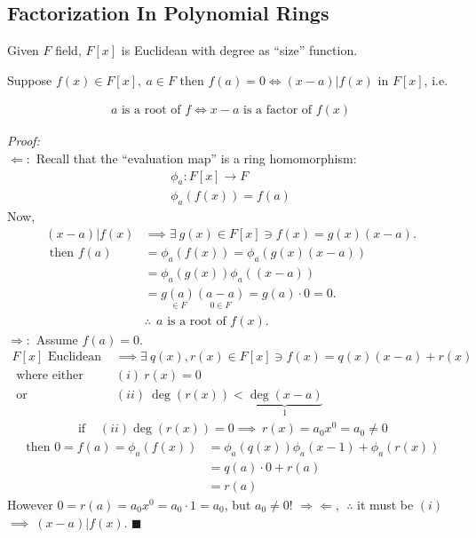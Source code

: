 \subsection*{Factorization In Polynomial Rings}
Given $F$ field, $F[x]$ is Euclidean with degree as ``size'' function.
\begin{lemma*}
    Suppose $f(x)\in F[x], \ a\in F$ then $f(a)=0 \iff (x-a)|f(x)$ in $F[x]$, i.e.
    \begin{center}
        \begin{align*}
            \boxed{ a \text{ is a root of }f \iff x-a \text{ is a factor of }f(x)}
        \end{align*}
    \end{center}
    \noindent \textit{Proof:} \\

    \noindent $\Leftarrow:$ Recall that the ``evaluation map'' is a ring homomorphism:
    \begin{align*}
        \phi_a: F[x]\rightarrow F \\
        \phi_a(f(x))=f(a)
    \end{align*}
    Now,
    \begin{align*}
        (x-a)|f(x) &\implies \exists \ g(x) \in F[x]\ni f(x)=g(x)(x-a). \\
        \text{ then }f(a) &= \phi_a(f(x))=\phi_a(g(x)(x-a)) \\
        &= \phi_a(g(x))\phi_a((x-a)) \\
        &= \underset{\in F}{g(a)}\underset{0\in F}{(a-a)} = g(a)\cdot 0 = 0. \\
        &\therefore \ \ a \text{ is a root of }f(x).
    \end{align*}
    \noindent $\Rightarrow :$ Assume $f(a)=0$. \\
    \begin{align*}
        F[x] \text{ Euclidean } &\implies \exists \ q(x), r(x) \in F[x] \ni f(x)=q(x)(x-a)+r(x) \\
        \text{ where either } &(i) \ r(x)=0  \\
        \text{ or } &(ii) \ \deg(r(x))< \underbrace{\deg(x-a)}_{1}
    \end{align*}
    \begin{align*}
        \text{ if }&(ii) \deg(r(x))=0 \implies \ r(x)=a_0x^0 = a_0 \neq 0
    \end{align*}
    \begin{align*}
        \text{ then } 0 = f(a) = \phi_a(f(x)) &= \phi_a(q(x))\phi_a(x-1)+\phi_a(r(x)) \\
        &= q(a)\cdot 0 + r(a) \\
        &= r(a)
    \end{align*}
    However $0=r(a)=a_0x^0 = a_0\cdot 1 = a_0$, but $a_0 \neq 0$!
    $\Rightarrow \Leftarrow, \ \ \therefore$ it must be $(i)$ \\
    $\implies \ (x-a)|f(x)$. $\blacksquare$
\end{lemma*}

